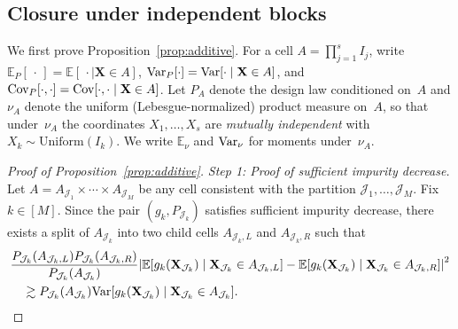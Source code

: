 \documentclass[11pt]{article}
\theoremstyle{plain}
\theoremstyle{definition}
\theoremstyle{remark}
\theoremstyle{plain}
\newcommand{\bX}{\mathbf{X}}
\DeclarePairedDelimiter{\bracks}{[}{]}
\DeclarePairedDelimiter{\abs}{|}{|}
\newcommand{\E}{\mathbb{E}}
\newcommand{\Var}{\textnormal{Var}}
\newcommand{\Cov}{\textnormal{Cov}}
\newcommand{\1}{\mathbbm{1}}
\begin{document}
\subsection{Closure under independent blocks}

We first prove Proposition~\ref{prop:additive}. For a cell $A=\prod_{j=1}^sI_j$, write $\E_P[\,\cdot\,] = \E[\,\cdot \mid \bX \in A]$,
$\Var_P[\cdot] = \Var[\cdot \mid \bX \in A]$, and
$\Cov_P[\cdot, \cdot] = \Cov[\cdot, \cdot \mid \bX \in A]$.
Let $P_A$ denote the design law conditioned on~$A$ and $\nu_A$ denote the uniform (Lebesgue-normalized) product measure on~$A$, so that under~$\nu_A$ the coordinates $X_1, \ldots, X_s$ are \emph{mutually independent} with $X_k \sim \mathrm{Uniform}(I_k)$. We write $\E_\nu$ and $\Var_\nu$ for moments under~$\nu_A$.

\begin{proof}[Proof of Proposition~\ref{prop:additive}]
    \textit{Step 1: Proof of sufficient impurity decrease.}
    Let $A = A_{\mathcal{J}_1} \times \cdots \times A_{\mathcal{J}_M}$
    be any cell consistent with the partition $\mathcal{J}_1, \dots, \mathcal{J}_M$. Fix $k \in [M]$. Since the pair $(g_k, P_{\mathcal{J}_k})$ satisfies sufficient impurity decrease, there exists a split of $A_{\mathcal{J}_k}$ into two child cells $A_{\mathcal{J}_k,L}$ and $A_{\mathcal{J}_k,R}$ such that
    \begin{equation*}
        \begin{aligned}
            &\frac{P_{\mathcal{J}_k}(A_{\mathcal{J}_k,L})P_{\mathcal{J}_k}(A_{\mathcal{J}_k,R})}{P_{\mathcal{J}_k}(A_{\mathcal{J}_k})}
            \abs*{ \E\bracks*{g_k(\bX_{\mathcal{J}_k}) \mid \bX_{\mathcal{J}_k} \in A_{\mathcal{J}_k,L}}
            - \E\bracks*{g_k(\bX_{\mathcal{J}_k}) \mid \bX_{\mathcal{J}_k} \in A_{\mathcal{J}_k,R}} }^2 \\
            &\quad \gtrsim P_{\mathcal{J}_k}(A_{\mathcal{J}_k}) \Var\bracks*{g_k(\bX_{\mathcal{J}_k}) \mid \bX_{\mathcal{J}_k} \in A_{\mathcal{J}_k}}.
        \end{aligned}
    \end{equation*}


\end{proof}
\end{document}
